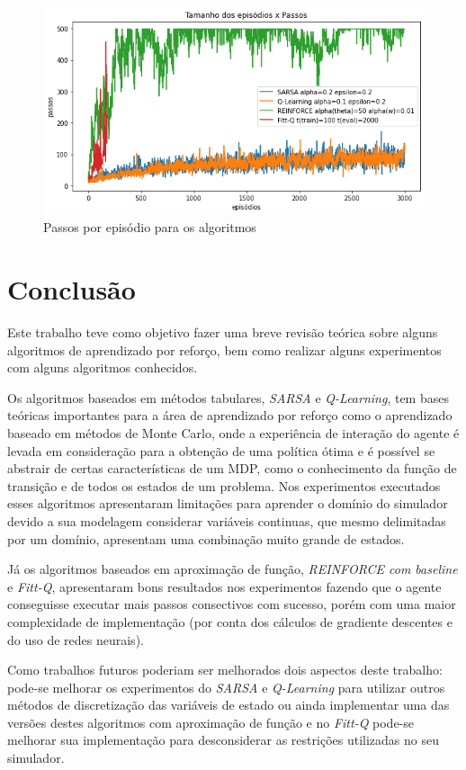 \documentclass[letterpaper]{article}
\begin{document}
\begin{figure}[t]
  \centering
  \includegraphics[width=0.9\columnwidth]{exp-allalgs-episodes}
  \caption{Passos por episódio para os algoritmos}
  \label{fig:exp-allalgs-episodes}
\end{figure}

\section{Conclusão}

Este trabalho teve como objetivo fazer uma breve revisão teórica sobre alguns algoritmos de aprendizado por reforço, bem como realizar alguns experimentos com alguns algoritmos conhecidos.

Os algoritmos baseados em métodos tabulares, \textit{SARSA} e \textit{Q-Learning}, tem bases teóricas importantes para a área de aprendizado por reforço como o aprendizado baseado em métodos de Monte Carlo, onde a experiência de interação do agente é levada em consideração para a obtenção de uma política ótima e é possível se abstrair de certas características de um MDP, como o conhecimento da função de transição e de todos os estados de um problema. Nos experimentos executados esses algoritmos apresentaram limitações para aprender o domínio do simulador devido a sua modelagem considerar variáveis continuas, que mesmo delimitadas por um domínio, apresentam uma combinação muito grande de estados.

Já os algoritmos baseados em aproximação de função, \textit{REINFORCE com baseline} e \textit{Fitt-Q}, apresentaram bons resultados nos experimentos fazendo que o agente conseguisse executar mais passos consectivos com sucesso, porém com uma maior complexidade de implementação (por conta dos cálculos de gradiente descentes e do uso de redes neurais).

Como trabalhos futuros poderiam ser melhorados dois aspectos deste trabalho: pode-se melhorar os experimentos do \textit{SARSA} e \textit{Q-Learning} para utilizar outros métodos de discretização das variáveis de estado ou ainda implementar uma das versões destes algoritmos com aproximação de função e no \textit{Fitt-Q} pode-se melhorar sua implementação para desconsiderar as restrições utilizadas no seu simulador.



\end{document}
